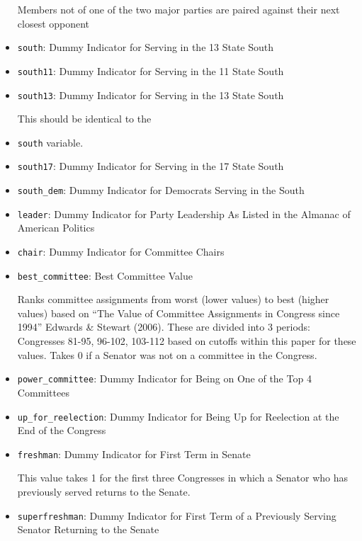\documentclass[12pt]{article}
\begin{document}
\begin{itemize}
	Members not of one of the two major parties are paired against their next closest opponent
	
	\item \verb|south|: Dummy Indicator for Serving in the 13 State South
	
	\item \verb|south11|: Dummy Indicator for Serving in the 11 State South
	
	\item \verb|south13|: Dummy Indicator for Serving in the 13 State South
	
	This should be identical to the \item \verb|south| variable.
	
	\item \verb|south17|: Dummy Indicator for Serving in the 17 State South
	
	\item \verb|south_dem|: Dummy Indicator for Democrats Serving in the South
	
	\item \verb|leader|: Dummy Indicator for Party Leadership As Listed in the Almanac of American Politics
	
	\item \verb|chair|: Dummy Indicator for Committee Chairs
	
	\item \verb|best_committee|: Best Committee Value
	
	Ranks committee assignments from worst (lower values) to best (higher values) based on ``The Value of Committee Assignments in Congress since 1994'' Edwards \& Stewart (2006). These are divided into 3 periods: Congresses 81-95, 96-102, 103-112 based on cutoffs within this paper for these values. Takes 0 if a Senator was not on a committee in the Congress.
	
	\item \verb|power_committee|: Dummy Indicator for Being on One of the Top 4 Committees
	
	\item \verb|up_for_reelection|: Dummy Indicator for Being Up for Reelection at the End of the Congress
	
	\item \verb|freshman|: Dummy Indicator for First Term in Senate
	
	This value takes 1 for the first three Congresses in which a Senator who has previously served returns to the Senate.
	
	\item \verb|superfreshman|: Dummy Indicator for First Term of a Previously Serving Senator Returning to the Senate
	

\end{itemize}
\end{document}
